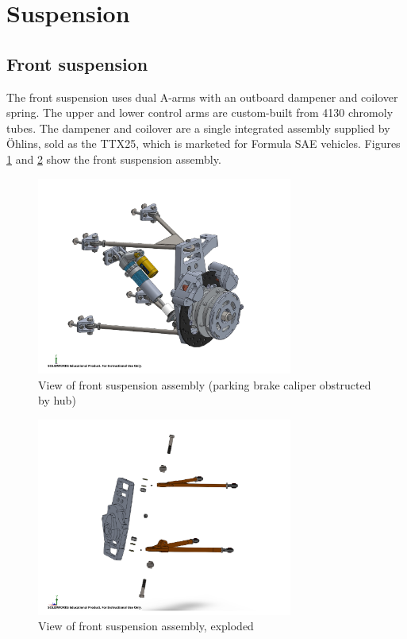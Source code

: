\documentclass[10pt]{article}
\begin{document}
\section{Suspension}
\subsection{Front suspension}
The front suspension uses dual A-arms with an outboard dampener and coilover spring. The upper and lower control arms are custom-built from 4130 chromoly tubes. The dampener and coilover are a single integrated assembly supplied by \"Ohlins, sold as the TTX25, which is marketed for Formula SAE vehicles. Figures \ref{fig:front-suspension} and \ref{fig:front-suspension-exploded} show the front suspension assembly.

\begin{figure}
\centering
\includegraphics[width=0.75\textwidth]{figures/front-suspension}
\caption{View of front suspension assembly (parking brake caliper obstructed by hub)}
\label{fig:front-suspension}
\end{figure}

\begin{figure}
\centering
\includegraphics[width=0.75\textwidth]{figures/front-suspension-exploded}
\caption{View of front suspension assembly, exploded}
\label{fig:front-suspension-exploded}
\end{figure}
\end{document}
